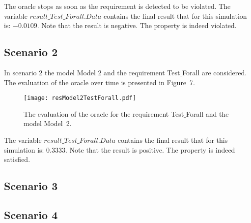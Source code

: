\documentclass[12pt]{extarticle}
\newcommand{\<}{\langle}
\renewcommand{\>}{\rangle}
\theoremstyle{definition}
\begin{document}
The oracle stops as soon as the requirement is detected to be violated.
The variable  $result\_Test\_Forall.Data$  contains the final result that for this simulation is: $-0.0109$.
Note that the result is negative. 
The property is indeed violated.

\subsection{Scenario 2}
In scenario 2 the model Model 2 and the requirement Test$\_$Forall are considered. 
The evaluation of the oracle over time is presented in Figure~7.

\begin{figure}[h]
\caption{The evaluation of the oracle for the requirement Test$\_$Forall  and the model Model~2.}
  \centering
    \texttt{[image: resModel2TestForall.pdf]}
\end{figure}

The variable $result\_Test\_Forall.Data$ contains the final result that for this simulation is: $0.3333$.
Note that the result is positive.
The property is indeed satisfied.


\subsection{Scenario 3}

\subsection{Scenario 4}
\end{document}
